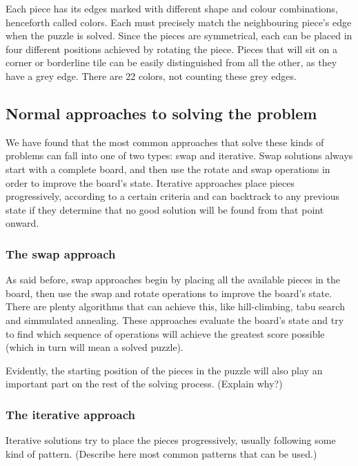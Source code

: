 \documentclass{llncs}
\begin{document}
Each piece has its edges marked with different shape and colour combinations, henceforth called colors. Each must precisely match the neighbouring piece's edge when the puzzle is solved. Since the pieces are symmetrical, each can be placed in four different positions achieved by rotating the piece. Pieces that will sit on a corner or borderline tile can be easily distinguished from all the other, as they have a grey edge. There are 22 colors, not counting these grey edges.


\subsection{Normal approaches to solving the problem}

We have found that the most common approaches that solve these kinds of problems can fall into one of two types: swap and iterative. Swap solutions always start with a complete board, and then use the rotate and swap operations in order to improve the board's state. Iterative approaches place pieces progressively, according to a certain criteria and can backtrack to any previous state if they determine that no good solution will be found from that point onward.

\subsubsection{The swap approach}

As said before, swap approaches begin by placing all the available pieces in the board, then use the swap and rotate operations to improve the board's state. There are plenty algorithms that can achieve this, like hill-climbing, tabu search and simmulated annealing. These approaches evaluate the board's state and try to find which sequence of operations will achieve the greatest score possible (which in turn will mean a solved puzzle).

Evidently, the starting position of the pieces in the puzzle will also play an important part on the rest of the solving process. (Explain why?)

\subsubsection{The iterative approach}

Iterative solutions try to place the pieces progressively, usually following some kind of pattern.
(Describe here most common patterns that can be used.)
\end{document}
